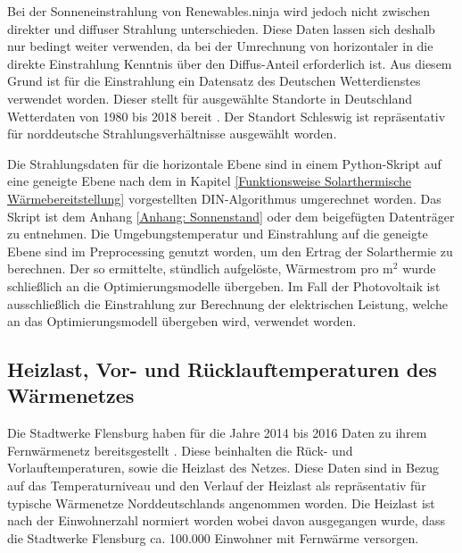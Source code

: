 Bei der Sonneneinstrahlung von Renewables.ninja wird jedoch nicht zwischen direkter und diffuser Strahlung unterschieden. Diese Daten lassen sich deshalb nur bedingt weiter verwenden, da bei der Umrechnung von horizontaler in die direkte Einstrahlung Kenntnis über den Diffus-Anteil erforderlich ist. Aus diesem Grund ist für die Einstrahlung ein Datensatz des Deutschen Wetterdienstes verwendet worden. Dieser stellt für ausgewählte Standorte in Deutschland Wetterdaten von 1980 bis 2018 bereit \cite{DWDstrahlung}. Der Standort Schleswig ist repräsentativ für norddeutsche Strahlungsverhältnisse ausgewählt worden.

Die Strahlungsdaten für die horizontale Ebene sind in einem Python-Skript auf eine geneigte Ebene nach dem in Kapitel \ref{Funktionsweise Solarthermische Wärmebereitstellung} vorgestellten DIN-Algorithmus umgerechnet worden. Das Skript ist dem Anhang \ref{Anhang: Sonnenstand} oder dem beigefügten Datenträger zu entnehmen. Die Umgebungstemperatur und Einstrahlung auf die geneigte Ebene sind im Preprocessing genutzt worden, um den Ertrag der Solarthermie zu berechnen. Der so ermittelte, stündlich aufgelöste, Wärmestrom pro m$^2$ wurde schließlich an die Optimierungsmodelle übergeben. Im Fall der Photovoltaik ist ausschließlich die Einstrahlung zur Berechnung der elektrischen Leistung, welche an das Optimierungsmodell übergeben wird, verwendet worden.

\subsection*{Heizlast, Vor- und Rücklauftemperaturen des Wärmenetzes}
Die Stadtwerke Flensburg haben für die Jahre 2014 bis 2016 Daten zu ihrem Fernwärmenetz bereitsgestellt \cite{stadtwerke_flensburg_gmbh_2019_2553968}. Diese beinhalten die Rück- und Vorlauftemperaturen, sowie die Heizlast des Netzes. Diese Daten sind in Bezug auf das Temperaturniveau und den Verlauf der Heizlast als repräsentativ für typische Wärmenetze Norddeutschlands angenommen worden. Die Heizlast ist nach der Einwohnerzahl normiert worden wobei davon ausgegangen wurde, dass die Stadtwerke Flensburg ca. 100.000 Einwohner mit Fernwärme versorgen.

